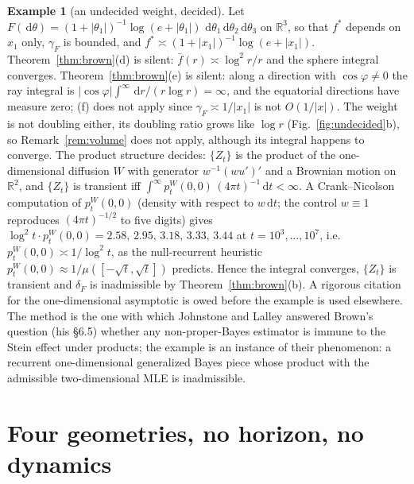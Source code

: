 \documentclass[a4paper,11pt,noarxiv]{quantumarticle}
\newcommand{\R}{\mathbb{R}}
\newcommand{\abs}[1]{\lvert #1\rvert}
\newcommand{\dd}{\,\mathrm{d}}
\newcommand{\fbar}{\bar f}
\theoremstyle{plain}
\theoremstyle{definition}
\newtheorem{example}[proposition]{Example}
\theoremstyle{remark}
\begin{document}
\begin{example}[an undecided weight, decided]\label{ex:log}
Let $F(\dd\theta)=(1+\abs{\theta_1})^{-1}\log(e+\abs{\theta_1})\,
\dd\theta_1\dd\theta_2\dd\theta_3$ on $\R^3$, so that $f^*$ depends on
$x_1$ only, $\gamma_F$ is bounded, and
$f^*\asymp(1+\abs{x_1})^{-1}\log(e+\abs{x_1})$.
Theorem~\ref{thm:brown}(d) is silent: $\fbar(r)\asymp\log^2r/r$ and
the sphere integral converges. Theorem~\ref{thm:brown}(e) is silent:
along a direction with $\cos\varphi\ne0$ the ray integral is
$\abs{\cos\varphi}\int^\infty\dd r/(r\log r)=\infty$, and the
equatorial directions have measure zero; (f) does not apply since
$\gamma_F\asymp1/\abs{x_1}$ is not $O(1/\abs x)$. The weight is not
doubling either, its doubling ratio grows like $\log r$
(Fig.~\ref{fig:undecided}b), so Remark~\ref{rem:volume} does not apply,
although its integral happens to converge. The product structure
decides: $\{Z_t\}$ is the product of the one-dimensional diffusion $W$
with generator $w^{-1}(wu')'$ and a Brownian motion on $\R^2$, and
$\{Z_t\}$ is transient iff $\int^\infty p^W_t(0,0)\,(4\pi t)^{-1}\dd t<\infty$.
A Crank--Nicolson computation of $p^W_t(0,0)$ (density with respect to
$w\dd t$; the control $w\equiv1$ reproduces $(4\pi t)^{-1/2}$ to five
digits) gives $\log^2\!t\cdot p^W_t(0,0)=2.58,\,2.95,\,3.18,\,3.33,\,3.44$
at $t=10^3,\dots,10^7$, i.e.\ $p^W_t(0,0)\asymp1/\log^2t$, as the
null-recurrent heuristic $p^W_t(0,0)\approx1/\mu([-\sqrt t,\sqrt t])$
predicts. Hence the integral converges, $\{Z_t\}$ is transient and
$\delta_F$ is inadmissible by Theorem~\ref{thm:brown}(b). A rigorous
citation for the one-dimensional asymptotic is owed before the example
is used elsewhere. The method is the one with which Johnstone and
Lalley \cite{johnstonelalley1984} answered Brown's question (his
\S6.5) whether any non-proper-Bayes estimator is immune to the Stein
effect under products; the example is an instance of their phenomenon:
a recurrent one-dimensional generalized Bayes piece whose product with
the admissible two-dimensional MLE is inadmissible.
\end{example}

\section{Four geometries, no horizon, no dynamics}\label{sec:geoms}
\end{document}
